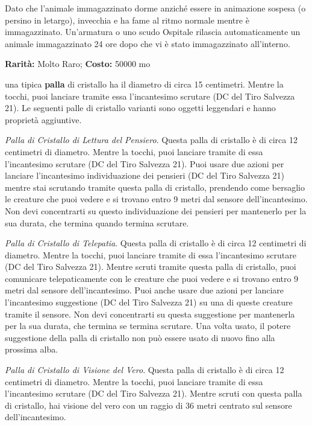 \begin{multicols}{2}
Dato che l'animale immagazzinato dorme anziché essere in animazione sospesa (o persino in letargo), invecchia e ha fame al ritmo normale mentre è immagazzinato. Un'armatura o uno scudo Ospitale rilascia automaticamente un animale immagazzinato 24 ore dopo che vi è stato immagazzinato all'interno.


\textbf{Rarità:} Molto Raro; \textbf{Costo:} 50000 mo

una tipica \textbf{palla} di cristallo ha il diametro di circa 15 centimetri. Mentre la tocchi, puoi lanciare tramite essa l'incantesimo scrutare (DC del Tiro Salvezza 21). Le seguenti palle di cristallo varianti sono oggetti leggendari e hanno proprietà aggiuntive.

\emph{Palla di Cristallo di Lettura del Pensiero}. Questa palla di cristallo è di circa 12 centimetri di diametro. Mentre la tocchi, puoi lanciare tramite di essa l'incantesimo scrutare (DC del Tiro Salvezza 21). Puoi usare due azioni per lanciare l'incantesimo individuazione dei pensieri (DC del Tiro Salvezza 21) mentre stai scrutando tramite questa palla di cristallo, prendendo come bersaglio le creature che puoi vedere e si trovano entro 9 metri dal sensore dell'incantesimo. Non devi concentrarti su questo individuazione dei pensieri per mantenerlo per la sua durata, che termina quando termina scrutare.

\emph{Palla di Cristallo di Telepatia}. Questa palla di cristallo è di circa 12 centimetri di diametro. Mentre la tocchi, puoi lanciare tramite di essa l'incantesimo scrutare (DC del Tiro Salvezza 21). Mentre scruti tramite questa palla di cristallo, puoi comunicare telepaticamente con le creature che puoi vedere e si trovano entro 9 metri dal sensore dell'incantesimo. Puoi anche usare due azioni per lanciare l'incantesimo suggestione (DC del Tiro Salvezza 21) su una di queste creature tramite il sensore. Non devi concentrarti su questa suggestione per mantenerla per la sua durata, che termina se termina scrutare. Una volta usato, il potere suggestione della palla di cristallo non può essere usato di nuovo fino alla prossima alba.

\emph{Palla di Cristallo di Visione del Vero}. Questa palla di cristallo è di circa 12 centimetri di diametro. Mentre la tocchi, puoi lanciare tramite di essa l'incantesimo scrutare (DC del Tiro Salvezza 21). Mentre scruti con questa palla di cristallo, hai visione del vero con un raggio di 36 metri centrato sul sensore dell'incantesimo.


\end{multicols}
